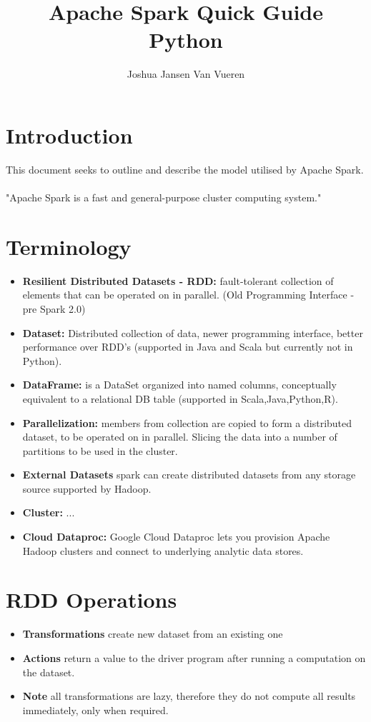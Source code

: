\documentclass[english]{article}
\begin{document}
\title{Apache Spark Quick Guide \\
Python}


\author{Joshua Jansen Van Vueren}

\maketitle

\section*{Introduction}
This document seeks to outline and describe the model utilised by Apache Spark.
\\\\
"Apache Spark is a fast and general-purpose cluster computing system."

\section{Terminology}
\begin{itemize}
\item \textbf{Resilient Distributed Datasets - RDD: } fault-tolerant collection of elements that can be operated on in parallel. (Old Programming Interface - pre Spark 2.0)
\item \textbf{Dataset: } Distributed collection of data, newer programming interface, better performance over RDD's (supported in Java and Scala but currently not in Python).
\item \textbf{DataFrame: } is a DataSet organized into named columns, conceptually equivalent to a relational DB table (supported in Scala,Java,Python,R).
\item \textbf{Parallelization: } members from collection are copied to form a distributed dataset, to be operated on in parallel. Slicing the data into a number of partitions to be used in the cluster.
\item \textbf{External Datasets} spark can create distributed datasets from any storage source supported by Hadoop.
\item \textbf{Cluster: } ...
\item \textbf{Cloud Dataproc: } Google Cloud Dataproc lets you provision Apache Hadoop clusters and connect to underlying analytic data stores.
\end{itemize}


\section{RDD Operations}
\begin{itemize}
\item \textbf{Transformations } create new dataset from an existing one
\item \textbf{Actions } return a value to the driver program after running a computation on the dataset.
\item \textbf{Note } all transformations are lazy, therefore they do not compute all results immediately, only when required.
\end{itemize}
\end{document}
